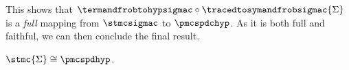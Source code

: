 This shows that \(
    \termandfrobtohypsigmac \circ \tracedtosymandfrobsigmac{\Sigma}
\) is a \emph{full} mapping from \(\stmcsigmac\) to \(\pmcspdchyp\).
As it is both full and faithful, we can then conclude the final result.

\begin{corollary}\label{cor:stmc-graph-iso}
    \(\stmc{\Sigma} \cong \pmcspdhyp\).
\end{corollary}

